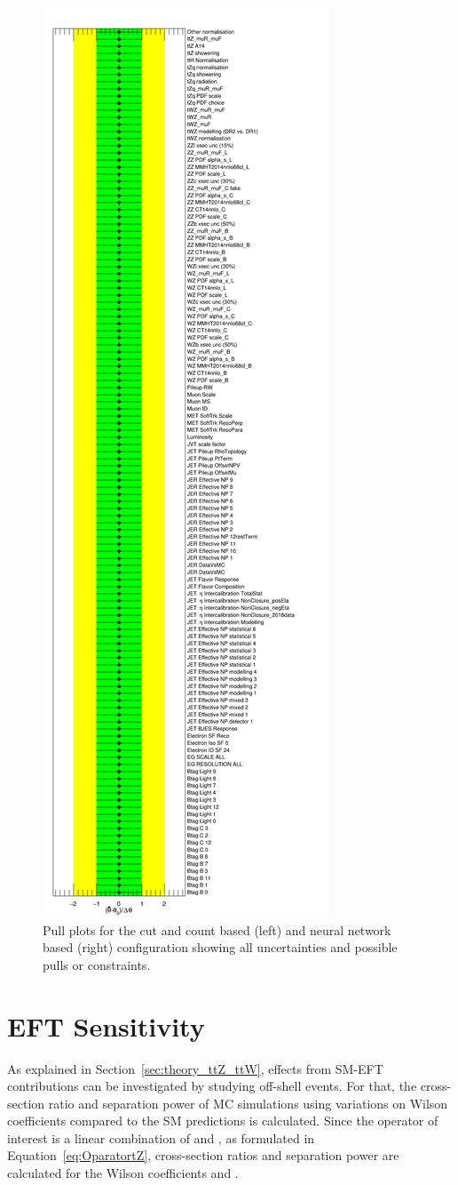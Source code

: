 \documentclass[bachelor,oneside, BCOR10mm,
			ngerman,english  %
]{GAUBM}
\begin{document}
\begin{figure}
	\includegraphics[width=.44\textwidth]{figures/final_config/pullplots/NuisPar.png}
	\caption{Pull plots for the cut and count based (left) and neural network based (right) configuration showing all uncertainties and possible pulls or constraints.}
	\label{fig:PullPlots}
\end{figure}


\chapter{EFT Sensitivity}
\label{ch:eft_sensitivity}
As explained in Section~\ref{sec:theory_ttZ_ttW}, effects from SM-EFT contributions can be investigated by studying off-shell \ttbarZ events. For that, the cross-section ratio and separation power of MC simulations using variations on Wilson coefficients compared to the SM predictions is calculated. Since the operator of interest \optZ is a linear combination of \optB and \optW, as formulated in Equation~\ref{eq:OparatortZ}, cross-section ratios and separation power are calculated for the Wilson coefficients \ctB and \ctW.
\end{document}
